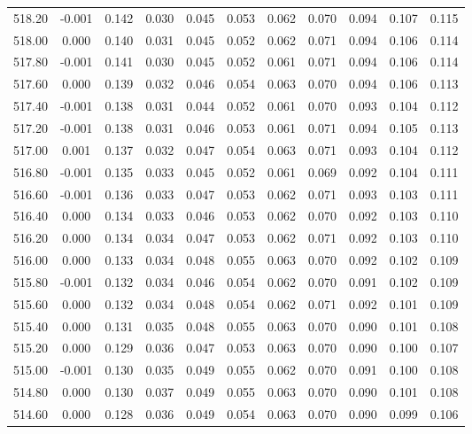 \begin{longtable}{cccccccccc}
    518.20 & -0.001 &  0.142 &  0.030 &  0.045 &  0.053 &  0.062 &  0.070 &  0.094 &  0.107 &  0.115 \\
    518.00 &  0.000 &  0.140 &  0.031 &  0.045 &  0.052 &  0.062 &  0.071 &  0.094 &  0.106 &  0.114 \\
    517.80 & -0.001 &  0.141 &  0.030 &  0.045 &  0.052 &  0.061 &  0.071 &  0.094 &  0.106 &  0.114 \\
    517.60 &  0.000 &  0.139 &  0.032 &  0.046 &  0.054 &  0.063 &  0.070 &  0.094 &  0.106 &  0.113 \\
    517.40 & -0.001 &  0.138 &  0.031 &  0.044 &  0.052 &  0.061 &  0.070 &  0.093 &  0.104 &  0.112 \\
    517.20 & -0.001 &  0.138 &  0.031 &  0.046 &  0.053 &  0.061 &  0.071 &  0.094 &  0.105 &  0.113 \\
    517.00 &  0.001 &  0.137 &  0.032 &  0.047 &  0.054 &  0.063 &  0.071 &  0.093 &  0.104 &  0.112 \\
    516.80 & -0.001 &  0.135 &  0.033 &  0.045 &  0.052 &  0.061 &  0.069 &  0.092 &  0.104 &  0.111 \\
    516.60 & -0.001 &  0.136 &  0.033 &  0.047 &  0.053 &  0.062 &  0.071 &  0.093 &  0.103 &  0.111 \\
    516.40 &  0.000 &  0.134 &  0.033 &  0.046 &  0.053 &  0.062 &  0.070 &  0.092 &  0.103 &  0.110 \\
    516.20 &  0.000 &  0.134 &  0.034 &  0.047 &  0.053 &  0.062 &  0.071 &  0.092 &  0.103 &  0.110 \\
    516.00 &  0.000 &  0.133 &  0.034 &  0.048 &  0.055 &  0.063 &  0.070 &  0.092 &  0.102 &  0.109 \\
    515.80 & -0.001 &  0.132 &  0.034 &  0.046 &  0.054 &  0.062 &  0.070 &  0.091 &  0.102 &  0.109 \\
    515.60 &  0.000 &  0.132 &  0.034 &  0.048 &  0.054 &  0.062 &  0.071 &  0.092 &  0.101 &  0.109 \\
    515.40 &  0.000 &  0.131 &  0.035 &  0.048 &  0.055 &  0.063 &  0.070 &  0.090 &  0.101 &  0.108 \\
    515.20 &  0.000 &  0.129 &  0.036 &  0.047 &  0.053 &  0.063 &  0.070 &  0.090 &  0.100 &  0.107 \\
    515.00 & -0.001 &  0.130 &  0.035 &  0.049 &  0.055 &  0.062 &  0.070 &  0.091 &  0.100 &  0.108 \\
    514.80 &  0.000 &  0.130 &  0.037 &  0.049 &  0.055 &  0.063 &  0.070 &  0.090 &  0.101 &  0.108 \\
    514.60 &  0.000 &  0.128 &  0.036 &  0.049 &  0.054 &  0.063 &  0.070 &  0.090 &  0.099 &  0.106 \\

\end{longtable}
